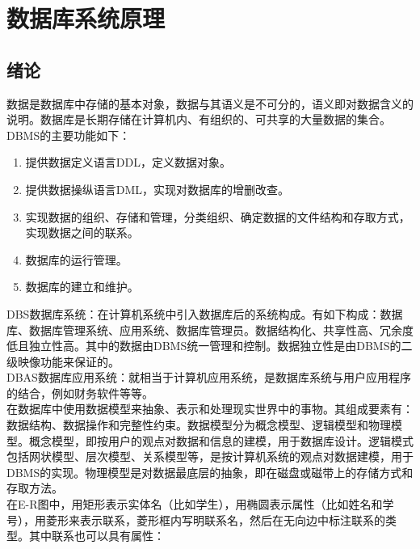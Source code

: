 \section{数据库系统原理}
\subsection{绪论}
数据是数据库中存储的基本对象，数据与其语义是不可分的，语义即对数据含义的说明。数据库是长期存储在计算机内、有组织的、可共享的大量数据的集合。\\
DBMS的主要功能如下：\\
\begin{enumerate}
    \item 提供数据定义语言DDL，定义数据对象。
    \item 提供数据操纵语言DML，实现对数据库的增删改查。
    \item 实现数据的组织、存储和管理，分类组织、确定数据的文件结构和存取方式，实现数据之间的联系。
    \item 数据库的运行管理。
    \item 数据库的建立和维护。
\end{enumerate}
DBS数据库系统：在计算机系统中引入数据库后的系统构成。有如下构成：数据库、数据库管理系统、应用系统、数据库管理员。数据结构化、共享性高、冗余度低且独立性高。其中的数据由DBMS统一管理和控制。数据独立性是由DBMS的二级映像功能来保证的。\\
DBAS数据库应用系统：就相当于计算机应用系统，是数据库系统与用户应用程序的结合，例如财务软件等等。\\
在数据库中使用数据模型来抽象、表示和处理现实世界中的事物。其组成要素有：数据结构、数据操作和完整性约束。数据模型分为概念模型、逻辑模型和物理模型。概念模型，即按用户的观点对数据和信息的建模，用于数据库设计。逻辑模式包括网状模型、层次模型、关系模型等，是按计算机系统的观点对数据建模，用于DBMS的实现。物理模型是对数据最底层的抽象，即在磁盘或磁带上的存储方式和存取方法。\\
在E-R图中，用矩形表示实体名（比如学生），用椭圆表示属性（比如姓名和学号），用菱形来表示联系，菱形框内写明联系名，然后在无向边中标注联系的类型。其中联系也可以具有属性：
